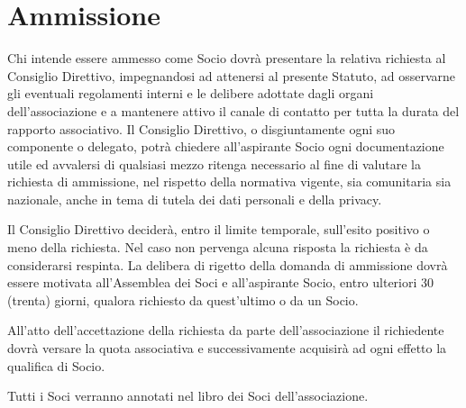\documentclass[legalpaper, 11pt]{exam}
\let\tempone\enumerate
\let\temptwo\endenumerate
\renewenvironment{enumerate}{\tempone\addtolength{\itemsep}{-0.45\baselineskip}}{\temptwo}
\begin{document}
{\section{Ammissione}
\begin{enumerate}
 \item Chi intende essere ammesso come Socio dovrà presentare la relativa richiesta al Consiglio Direttivo, impegnandosi ad attenersi al presente Statuto, ad osservarne gli eventuali regolamenti interni e le delibere adottate dagli organi dell’associazione e a mantenere attivo il canale di contatto per tutta la durata del rapporto associativo. Il Consiglio Direttivo, o disgiuntamente ogni suo componente o delegato, potrà chiedere all’aspirante Socio ogni documentazione utile ed avvalersi di qualsiasi mezzo ritenga necessario al fine di valutare la richiesta di ammissione, nel rispetto della normativa vigente, sia comunitaria sia nazionale, anche in tema di tutela dei dati personali e della privacy.
 \item Il Consiglio Direttivo deciderà, entro il limite temporale, sull’esito positivo o meno della richiesta. Nel caso non pervenga alcuna risposta la richiesta è da considerarsi respinta. La delibera di rigetto della domanda di ammissione dovrà essere motivata all’Assemblea dei Soci e all'aspirante Socio, entro ulteriori 30 (trenta) giorni, qualora richiesto da quest'ultimo o da un Socio.
 \item All’atto dell’accettazione della richiesta da parte dell’associazione il richiedente dovrà versare la quota associativa e successivamente acquisirà ad ogni effetto la qualifica di Socio.
 \item Tutti i Soci verranno annotati nel libro dei Soci dell’associazione.
\end{enumerate}

}
\end{document}
